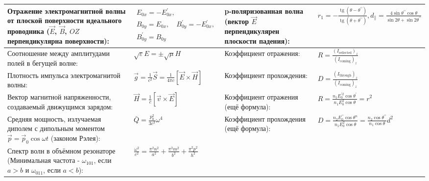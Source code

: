 \documentclass{article}
\begin{document}
\begin{tabular}{ |p{5cm}|p{4.5cm}|p{6cm}|p{3.5cm}|  }
\hline
Отражение электромагнитной волны от плоской поверхности идеального проводника ($\vec{E}$, $\vec{B}$, $OZ$ перпендикулярна поверхности):&
$\begin{aligned}
E_{0 x}=-E_{0 x}^{\prime}, \\
B_{0 y}=E_{0 x}, \quad B_{0 y}^{\prime}=-E_{0 x}^{\prime}, \\
B_{0 y}^{\prime}=B_{0 y}
\end{aligned}$                                                             &
p-поляризованная волна (вектор $\vec{E}$ перпендикулярен плоскости падения):&
$r_{1}=-\frac{\operatorname{tg}\left(\theta-\theta^{\prime \prime}\right)}{\operatorname{tg}\left(\theta+\theta^{\prime \prime}\right)}, d_{\|}=\frac{4 \sin \theta^{\prime \prime} \cos \theta}{\sin 2 \theta+\sin 2 \theta^{\prime \prime}}$\\
\hline
Соотношение между амплитудами полей в бегущей волне:                       &
$\sqrt{\varepsilon} E=\pm \sqrt{\mu} H$                                    &
Коэффициент отражения:                                                     &
$R=\frac{\left(I_{\mathrm{reflected}}\right)_{z}}{\left(I_{\mathrm{coming}}\right)_{z}}$\\
\hline
Плотность импульса электромагнитой волны:                                  &
$\vec{g}=\frac{1}{c^{2}} \vec{S}=\frac{1}{4 \pi c} [\vec{E} \times \vec{H}]$&
Коэффициент прохождения:                                                   &
$D=\frac{\left(I_{\text {through}}\right)_{z}}{\left(I_{\text {coming}}\right)_{z}}$ \\
\hline
Вектор магнитной напряженности, создаваемый движущимся зарядом:            &
$\vec{H}=\frac{1}{c} [\vec{v} \times \vec{E}]$                             &
Коэффициент отражения (ещё формула):                                       &
$R=\frac{n_{1} E_{0}^{\prime 2} \cos \theta^{\prime}}{n_{1} E_{0}^{2} \cos \theta}=r^{2}$\\
\hline
Средняя мощность, излучаемая диполем с дипольным моментом $\vec{p}=\vec{p}_{0} \cos \omega t$ (законом Рэлея):&
$\bar{Q}=\frac{p_{0}^{2}}{3 c^{3}} \omega^{4}$                             &
Коэффициент прохождения (ещё формула):                                     &
$D=\frac{n_{2} E_{0}^{\prime \prime} \cos \theta^{n}}{n_{1} E_{0}^{2} \cos \theta}=\frac{n_{2} \cos \theta^{\prime \prime}}{n_{1} \cos \theta} d^{2}$\\
\hline
Спектр волн в объёмном резонаторе (Минимальная частота - $\omega_{101}$, если $a > b$ и $\omega_{011}$, если $a < b$): &
$\frac{\omega^{2}}{c^{2}}=\frac{\pi^{2} n^{2}}{a^{2}}+\frac{\pi^{2} m^{2}}{b^{2}}+\frac{\pi^{2} p^{2}}{h^{2}}$ &

\end{tabular}
\end{document}
